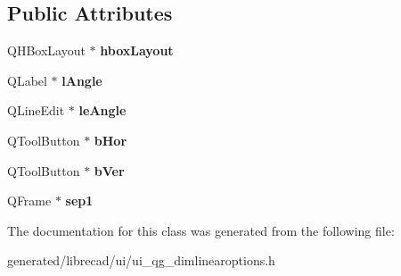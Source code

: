 \subsection*{Public Attributes}
\begin{DoxyCompactItemize}
\item 
\hypertarget{classUi__QG__DimLinearOptions_ae30836203b99144f338c27857a64eb2a}{Q\-H\-Box\-Layout $\ast$ {\bfseries hbox\-Layout}}\label{classUi__QG__DimLinearOptions_ae30836203b99144f338c27857a64eb2a}

\item 
\hypertarget{classUi__QG__DimLinearOptions_a7adffdd1c783926b8a71b841b63ac7a4}{Q\-Label $\ast$ {\bfseries l\-Angle}}\label{classUi__QG__DimLinearOptions_a7adffdd1c783926b8a71b841b63ac7a4}

\item 
\hypertarget{classUi__QG__DimLinearOptions_a31d7cdda579eb623cdd1d116af63da69}{Q\-Line\-Edit $\ast$ {\bfseries le\-Angle}}\label{classUi__QG__DimLinearOptions_a31d7cdda579eb623cdd1d116af63da69}

\item 
\hypertarget{classUi__QG__DimLinearOptions_a776ba2d564afac2e515d29dc6f5130a3}{Q\-Tool\-Button $\ast$ {\bfseries b\-Hor}}\label{classUi__QG__DimLinearOptions_a776ba2d564afac2e515d29dc6f5130a3}

\item 
\hypertarget{classUi__QG__DimLinearOptions_a503ccc242742e955755d401700c4bf68}{Q\-Tool\-Button $\ast$ {\bfseries b\-Ver}}\label{classUi__QG__DimLinearOptions_a503ccc242742e955755d401700c4bf68}

\item 
\hypertarget{classUi__QG__DimLinearOptions_a07b60ce771b0eb73c971568f9b958c55}{Q\-Frame $\ast$ {\bfseries sep1}}\label{classUi__QG__DimLinearOptions_a07b60ce771b0eb73c971568f9b958c55}

\end{DoxyCompactItemize}


The documentation for this class was generated from the following file\-:\begin{DoxyCompactItemize}
\item 
generated/librecad/ui/ui\-\_\-qg\-\_\-dimlinearoptions.\-h\end{DoxyCompactItemize}
